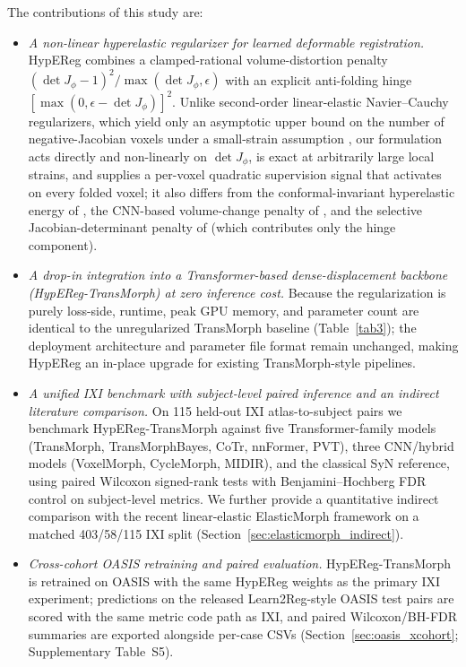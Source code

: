 \documentclass[jimaging,article,submit,pdftex,moreauthors]{Definitions/mdpi}
\begin{document}
The contributions of this study are:
\begin{itemize}
\item \emph{A non-linear hyperelastic regularizer for learned deformable registration.} HypEReg combines a clamped-rational volume-distortion penalty $(\det J_\phi-1)^2/\max(\det J_\phi,\epsilon)$ with an explicit anti-folding hinge $[\max(0,\epsilon-\det J_\phi)]^2$. Unlike second-order linear-elastic Navier--Cauchy regularizers, which yield only an asymptotic upper bound on the number of negative-Jacobian voxels under a small-strain assumption \cite{elasticmorph2025}, our formulation acts directly and non-linearly on $\det J_\phi$, is exact at arbitrarily large local strains, and supplies a per-voxel quadratic supervision signal that activates on every folded voxel; it also differs from the conformal-invariant hyperelastic energy of \citet{zou2023conformal}, the CNN-based volume-change penalty of \citet{hering2021lung}, and the selective Jacobian-determinant penalty of \citet{mok2020fast} (which contributes only the hinge component).
\item \emph{A drop-in integration into a Transformer-based dense-displacement backbone (HypEReg-TransMorph) at zero inference cost.} Because the regularization is purely loss-side, runtime, peak GPU memory, and parameter count are identical to the unregularized TransMorph baseline (Table~\ref{tab3}); the deployment architecture and parameter file format remain unchanged, making HypEReg an in-place upgrade for existing TransMorph-style pipelines.
\item \emph{A unified IXI benchmark with subject-level paired inference and an indirect literature comparison.} On 115 held-out IXI atlas-to-subject pairs we benchmark HypEReg-TransMorph against five Transformer-family models (TransMorph, TransMorphBayes, CoTr, nnFormer, PVT), three CNN/hybrid models (VoxelMorph, CycleMorph, MIDIR), and the classical SyN reference, using paired Wilcoxon signed-rank tests with Benjamini--Hochberg FDR control on subject-level metrics. We further provide a quantitative indirect comparison with the recent linear-elastic ElasticMorph framework \cite{elasticmorph2025} on a matched 403/58/115 IXI split (Section~\ref{sec:elasticmorph_indirect}).
\item \emph{Cross-cohort OASIS retraining and paired evaluation.} HypEReg-TransMorph is retrained on OASIS with the same HypEReg weights as the primary IXI experiment; predictions on the released Learn2Reg-style OASIS test pairs are scored with the same metric code path as IXI, and paired Wilcoxon/BH-FDR summaries are exported alongside per-case CSVs (Section~\ref{sec:oasis_xcohort}; Supplementary Table~S5).

\end{itemize}
\end{document}

